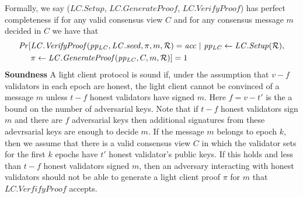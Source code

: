 Formally, we say ($\mathit{LC.Setup}$, $\mathit{LC.GenerateProof}$, $\mathit{LC.VerifyProof}$) has perfect completeness if 
for any valid consensus view $C$ and for any consensus message $m$ decided in $C$ we have that 
\begin{align*} 
\mathit{Pr} [&\mathit{LC.VerifyProof}(\mathit{pp_{\mathit{LC}}}, \LCseed, \pi, m, \mathcal{R}) = \mathit{acc} \ | \ \mathit{pp_{\mathit{LC}}} \leftarrow \mathit{LC.Setup}(\mathcal{R}),  \\
& \pi \leftarrow \mathit{LC.GenerateProof}(\mathit{pp_{\mathit{LC}}}, C, m, \mathcal{R})] = 1
\end{align*}
\noindent \textbf{Soundness} A light client protocol is sound if, under the assumption that $v-f$ validators in each epoch are honest, the light client cannot be convinced of a message $m$ unless $t-f$ honest validators have signed $m$. Here $f=v-t'$ is the a bound on the number of adversarial keys. Note that if $t-f$ honest validators sign $m$ and there are $f$ adversarial keys then additional signatures from these adevrsarial keys are enough to decide $m$. If the message $m$ belongs to epoch $k$, then we assume that there is a valid consensus view $C$ in which the validator sets for the first $k$ epochs have $t'$ honest validator's public keys. If this holds and less than $t-f$ honest validators signed $m$, then an adversary interacting with honest validators should not be able to generate a light client proof $\pi$ for $m$ that $LC.VerfifyProof$ accepts.

